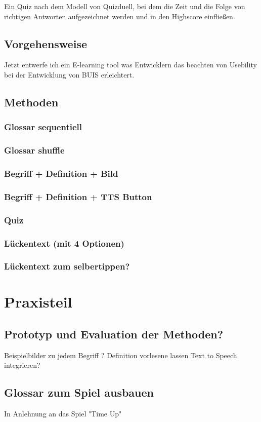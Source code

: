\documentclass[a4paper, 12pt, twoside, BCOR=20mm, DIV=calc, abstracton, parskip=half*, toc=bibliography, toc=listof, headsepline, headings=small, numbers=enddot]{scrreprt} %
\begin{document}
Ein Quiz nach dem Modell von Quizduell, bei dem die Zeit und die Folge von richtigen Antworten aufgezeichnet werden und in den Highscore einfließen.

\section{Vorgehensweise}
Jetzt entwerfe ich ein E-learning tool was Entwicklern das beachten von
Usebility bei der Entwicklung von BUIS erleichtert. 

\section{Methoden}
\subsection{Glossar sequentiell}
\subsection{Glossar shuffle}
\subsection{Begriff + Definition + Bild}
\subsection{Begriff + Definition + TTS Button}
\subsection{Quiz}
\subsection{Lückentext (mit 4 Optionen)}
\subsection{Lückentext zum selbertippen?}

\section{} 
\chapter{Praxisteil}
\section{Prototyp und Evaluation der Methoden?}
Beispielbilder zu jedem Begriff ? Definition vorlesene lassen Text to Speech integrieren?
\section{}
\section{Glossar zum Spiel ausbauen}
In Anlehnung an das Spiel "Time Up"

\printbibliography
\end{document}
